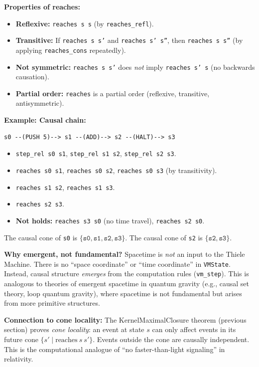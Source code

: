 \textbf{Properties of reaches:}
\begin{itemize}
    \item \textbf{Reflexive:} \texttt{reaches s s} (by \texttt{reaches\_refl}).
    \item \textbf{Transitive:} If \texttt{reaches s s'} and \texttt{reaches s' s''}, then \texttt{reaches s s''} (by applying \texttt{reaches\_cons} repeatedly).
    \item \textbf{Not symmetric:} \texttt{reaches s s'} does \textit{not} imply \texttt{reaches s' s} (no backwards causation).
    \item \textbf{Partial order:} \texttt{reaches} is a partial order (reflexive, transitive, antisymmetric).
\end{itemize}

\textbf{Example: Causal chain:}
\begin{verbatim}
s0 --(PUSH 5)--> s1 --(ADD)--> s2 --(HALT)--> s3
\end{verbatim}
\begin{itemize}
    \item \texttt{step\_rel s0 s1}, \texttt{step\_rel s1 s2}, \texttt{step\_rel s2 s3}.
    \item \texttt{reaches s0 s1}, \texttt{reaches s0 s2}, \texttt{reaches s0 s3} (by transitivity).
    \item \texttt{reaches s1 s2}, \texttt{reaches s1 s3}.
    \item \texttt{reaches s2 s3}.
    \item \textbf{Not holds:} \texttt{reaches s3 s0} (no time travel), \texttt{reaches s2 s0}.
\end{itemize}
The causal cone of \texttt{s0} is $\{\texttt{s0}, \texttt{s1}, \texttt{s2}, \texttt{s3}\}$. The causal cone of \texttt{s2} is $\{\texttt{s2}, \texttt{s3}\}$.

\textbf{Why emergent, not fundamental?} Spacetime is \textit{not} an input to the Thiele Machine. There is no ``space coordinate'' or ``time coordinate'' in \texttt{VMState}. Instead, causal structure \textit{emerges} from the computation rules (\texttt{vm\_step}). This is analogous to theories of emergent spacetime in quantum gravity (e.g., causal set theory, loop quantum gravity), where spacetime is not fundamental but arises from more primitive structures.

\textbf{Connection to cone locality:} The KernelMaximalClosure theorem (previous section) proves \textit{cone locality}: an event at state $s$ can only affect events in its future cone $\{s' \mid \text{reaches}\ s\ s'\}$. Events outside the cone are causally independent. This is the computational analogue of ``no faster-than-light signaling'' in relativity.

